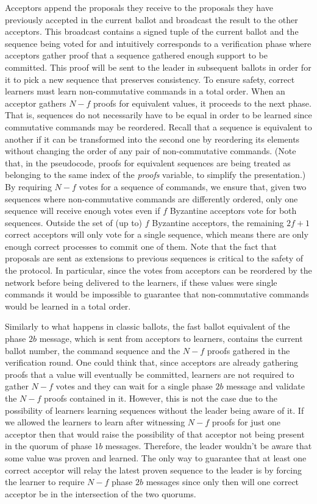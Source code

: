 Acceptors append the proposals they receive to the proposals they have previously accepted in the current ballot and broadcast the result to the other acceptors. This broadcast contains a signed tuple of the current ballot and the sequence being voted for and intuitively corresponds to a verification phase where acceptors gather proof that a sequence gathered enough support to be committed. This proof will be sent to the leader in subsequent ballots in order for it to pick a new sequence that preserves consistency. To ensure safety, correct learners must learn non-commutative commands in a total order. When an acceptor gathers $N-f$ proofs for equivalent values, it proceeds to the next phase. That is, sequences do not necessarily have to be equal in order to be learned since commutative commands may be reordered. Recall that a sequence is equivalent to another if it can be transformed into the second one by reordering its elements without changing the order of any pair of non-commutative commands. (Note that, in the pseudocode, proofs for equivalent sequences are being treated as belonging to the same index of the \emph{proofs} variable, to simplify the presentation.) By requiring $N-f$ votes for a sequence of commands, we ensure that, given two sequences where non-commutative commands are differently ordered, only one sequence will receive enough votes even if $f$ Byzantine acceptors vote for both sequences. Outside the set of (up to) $f$ Byzantine acceptors, the remaining $2f+1$ correct acceptors will only vote for a single sequence, which means there are only enough correct processes to commit one of them. Note that the fact that proposals are sent as extensions to previous sequences is critical to the safety of the protocol. In particular, since the votes from acceptors can be reordered by the network before being delivered to the learners, if these values were single commands it would be impossible to guarantee that non-commutative commands would be learned in a total order. \par
{} Similarly to what happens in classic ballots, the fast ballot equivalent of the phase $2b$ message, which is sent from acceptors to learners, contains the current ballot number, the command sequence and the $N-f$ proofs gathered in the verification round. One could think that, since acceptors are already gathering proofs that a value will eventually be committed, learners are not required to gather $N-f$ votes and they can wait for a single phase $2b$ message and validate the $N-f$ proofs contained in it. However, this is not the case due to the possibility of learners learning sequences without the leader being aware of it. If we allowed the learners to learn after witnessing $N-f$ proofs for just one acceptor then that would raise the possibility of that acceptor not being present in the quorum of phase $1b$ messages. Therefore, the leader wouldn't be aware that some value was proven and learned. The only way to guarantee that at least one correct acceptor will relay the latest proven sequence to the leader is by forcing the learner to require $N-f$ phase $2b$ messages since only then will one correct acceptor be in the intersection of the two quorums. \par
